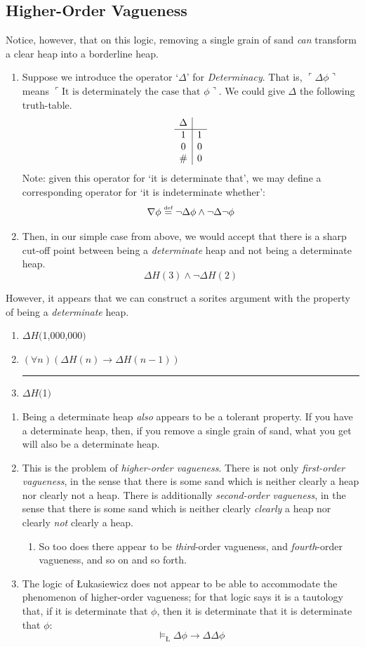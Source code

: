 \documentclass[landscape, two column, full page,reqno]{article}
\newcommand{\qe}{\begin{enumerate}[align=left,style=nextline,leftmargin=17pt,labelsep=5pt,font=\normalfont]}
\newcommand{\e}{\emph}
\newcommand{\ze}{\end{enumerate}}
\newcommand{\p}{\item}
\newcommand{\qq}[1]{ \ulcorner #1 \urcorner}
\newcommand{\thus}{

\vspace{5pt}
\hrule
}
\newcommand{\argu}[2]{\begin{center}\begin{minipage}{#1} \begin{enumerate}
	#2
\end{enumerate}
\end{minipage}  
\end{center}}
\begin{document}
 \subsection{Higher-Order Vagueness}
 \p Notice, however, that on this logic, removing a single grain of sand \e{can} transform a clear heap into a borderline heap.
	\qe
	\p Suppose we introduce the operator `$\Delta$' for \e{Determinacy}.  That is, $\qq{\Delta \phi}$ means $\qq{\text{It is determinately the case that } \phi }$.   We could give $\Delta$ the following truth-table.
		\[
		\begin{array}{c | c}
		\Delta	&	\\\hline
		1	&	1	\\
		0	&	0	\\
		\#	&	0	
		\end{array}
		\]
	Note: given this operator for `it is determinate that', we may define a corresponding operator for `it is indeterminate whether': \[\nabla \phi \stackrel{\text{\tiny def}}{=} \neg \Delta \phi \wedge \neg \Delta \neg \phi\]
	\p Then, in our simple case from above, we would accept that there is a sharp cut-off point between being a \e{determinate} heap and not being a determinate heap.
		\[
		\Delta H(\text{3}) \wedge \neg \Delta H(\text{2})
		\]
	\ze 
\p However, it appears that we can construct a sorites argument with the property of being a \e{determinate} heap.
	\argu{150pt}{
	\p[] $\Delta H ($1,000,000$)$
	\p[] $(\forall n) (\Delta H(n) \to \Delta H(n-1))$
	\thus
	\p[] $\Delta H($1$)$
	}
	\qe
	\p Being a determinate heap \e{also} appears to be a tolerant property.  If you have a determinate heap, then, if you remove a single grain of sand, what you get will also be a determinate heap.
	\p This is the problem of \e{higher-order vagueness}.  There is not only \e{first-order vagueness}, in the sense that there is some sand which is neither clearly a heap nor clearly not a heap.  There is additionally \e{second-order vagueness}, in the sense that there is some sand which is neither clearly \e{clearly} a heap nor clearly \e{not}  clearly a heap.
		\qe
		\p So too does there appear to be \e{third}-order vagueness, and \e{fourth}-order vagueness, and so on and so forth.
		\ze 
	\p The logic of \L ukasiewicz  does not appear to be able to accommodate the phenomenon  of higher-order vagueness; for that logic says it is a tautology that, if it is determinate that $\phi$, then it is determinate that it is determinate that $\phi$:
				\[
				\models_{\text{\L}} \Delta \phi \to \Delta \Delta \phi
				\]
	\ze 
\end{document}
